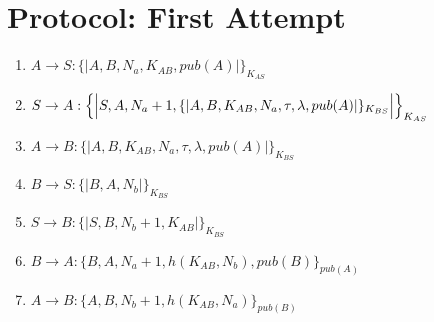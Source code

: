 \section{Protocol: First Attempt}

\begin{enumerate}
    \item $ A \rightarrow S : \{|A, B, N_a, K_{AB}, pub(A)|\}_{K_{AS}}$
    \item $ S \rightarrow A : \Bigl\{\Bigl|S,A, N_a + 1, \{|A,B,K_{AB},N_a, \tau, \lambda, pub(A) |\}_{K_{BS}}\Bigr|\Bigr\}_{K_{AS}}$
    \item $ A \rightarrow B : \{|A,B,K_{AB},N_a, \tau, \lambda, pub(A) |\}_{K_{BS}}$
    \item $ B \rightarrow S : \{|B, A, N_b|\}_{K_{BS}}$
    \item $ S \rightarrow B : \{|S, B, N_b + 1, K_{AB}|\}_{K_{BS}}$
    \item $ B \rightarrow A : \{B, A, N_a+1, h(K_{AB}, N_b), pub(B)\}_{pub(A)}$
    \item $ A \rightarrow B : \{A, B, N_b+1, h(K_{AB}, N_a)\}_{pub(B)}$

\end{enumerate}